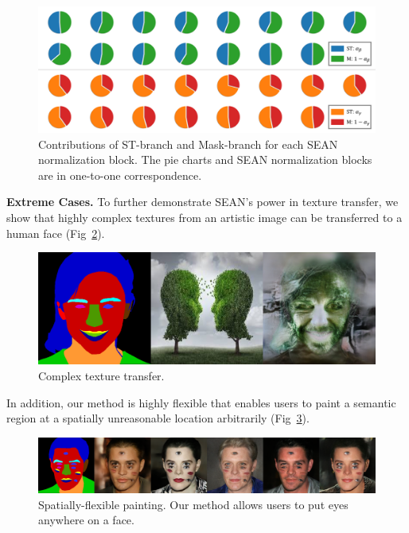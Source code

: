 \documentclass[10pt,twocolumn,letterpaper]{article}
\begin{document}

\begin{figure}[h]
\centering
\includegraphics[width=\linewidth]{Rebuttal/histogram.pdf}
\caption{Contributions of ST-branch and Mask-branch for each SEAN normalization block. The pie charts and SEAN normalization blocks are in one-to-one correspondence.}
\label{fig:weight histogram}
\end{figure}


\noindent \textbf{Extreme Cases.}
To further demonstrate SEAN's power in texture transfer, we show that highly complex textures from an artistic image can be transferred to a human face (Fig~\ref{fig:tree}).
\begin{figure}[h]
\centering
\includegraphics[width=0.8\linewidth]{Rebuttal/tree.png}
\caption{Complex texture transfer.}
\label{fig:tree}
\end{figure}

\vspace*{-5mm}
\noindent In addition, our method is highly flexible that enables users to paint a semantic region at a spatially unreasonable location arbitrarily (Fig~\ref{fig:monster}).

\begin{figure}[h]
\centering
\includegraphics[width=1.0\linewidth]{Rebuttal/monster.pdf}
\caption{Spatially-flexible painting. Our method allows users to put eyes anywhere on a face.}
\label{fig:monster}
\end{figure}
\end{document}
